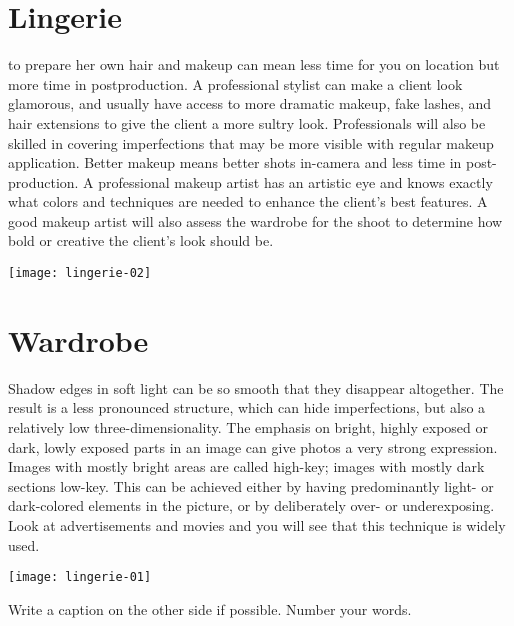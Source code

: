 \documentclass[twoside,11pt]{book}
\begin{document}
\chapter{Lingerie}
\thispagestyle{empty}

\begin{multicols}{2}
 to prepare her own hair and makeup can
mean less time for you on location but more time in postproduction.
A professional stylist can make a client look glamorous,
and usually have access to more dramatic makeup, fake lashes, and hair
extensions to give the client a more sultry look. Professionals will also
be skilled in covering imperfections that may be more visible with
regular makeup application. Better makeup means better shots
in-camera and less time in post-production. A professional makeup
artist has an artistic eye and knows exactly what colors and techniques
are needed to enhance the client’s best features. A good makeup artist
will also assess the wardrobe for the shoot to determine how bold or
creative the client’s look should be.

\lorem\lorem\lorem
\columnbreak
{
\parindent0pt

\texttt{[image: lingerie-02]}
\par

}
\end{multicols}

\chapter{Wardrobe}
\thispagestyle{empty}
\begin{multicols}{2}
\lorem\lorem\lorem\lorem
Shadow edges in soft light can be so smooth that they disappear
altogether. The result is a less pronounced structure, which can hide
imperfections, but also a relatively low three-dimensionality. The
emphasis on bright, highly exposed or dark, lowly exposed parts in an
image can give photos a very strong expression. Images with mostly
bright areas are called high-key; images with mostly dark sections
low-key. This can be achieved either by having predominantly light- or
dark-colored elements in the picture, or by deliberately over- or
underexposing. Look at advertisements and movies and you will see
that this technique is widely used. 

\noindent\texttt{[image: lingerie-01]}\par

Write a caption on the other side if possible. Number your words.
\lorem\lorem
\end{multicols}
\end{document}
